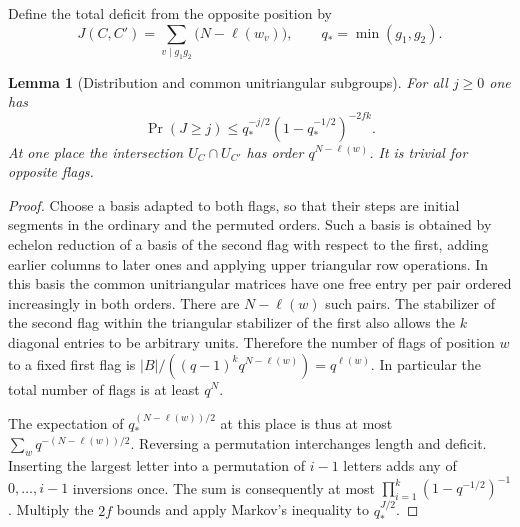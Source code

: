 \documentclass[a4paper,11pt]{article}
\newtheorem{lemma}[proposition]{Lemma}
\theoremstyle{definition}
\theoremstyle{remark}
\numberwithin{equation}{section}
\begin{document}
Define the total deficit from the opposite position by
\[
               J(C,C')=\sum_{v\mid g_1g_2}\bigl(N-\ell(w_v)\bigr),
               \qquad q_*=\min(g_1,g_2).
\]
\begin{lemma}[Distribution and common unitriangular subgroups]
\leavevmode\label{lem:flagdistribution658}
For all \(j\ge0\) one has
\[
       \Pr(J\ge j)\le
             q_*^{-j/2}(1-q_*^{-1/2})^{-2fk}.
\]
At one place the intersection \(U_C\cap U_{C'}\) has order
\(q^{N-\ell(w)}\). It is trivial for opposite flags.
\end{lemma}
\begin{proof}
Choose a basis adapted to both flags, so that their steps
are initial segments in the ordinary and the permuted orders.
Such a basis is obtained by echelon reduction of a basis of
the second flag with respect to the first, adding earlier
columns to later ones and applying upper triangular row
operations. In this basis the common unitriangular matrices have
one free entry per pair ordered increasingly in both orders.
There are \(N-\ell(w)\) such pairs. The stabilizer of the second
flag within the triangular stabilizer of the first also allows
the \(k\) diagonal entries to be arbitrary units. Therefore the
number of flags of position \(w\) to a fixed first flag is
\(|B|/((q-1)^kq^{N-\ell(w)})=q^{\ell(w)}\). In particular the
total number of flags is at least \(q^N\).

The expectation of \(q_*^{(N-\ell(w))/2}\) at this place is
thus at most \(\sum_w q^{-(N-\ell(w))/2}\). Reversing a
permutation interchanges length and deficit. Inserting the
largest letter into a permutation of \(i-1\) letters adds
any of \(0,\ldots,i-1\) inversions once. The sum is consequently
at most \(\prod_{i=1}^k(1-q^{-1/2})^{-1}\).
Multiply the \(2f\) bounds and apply Markov's inequality to
\(q_*^{J/2}\).
\end{proof}
\end{document}
